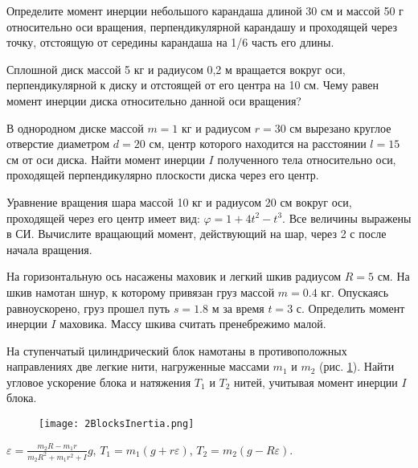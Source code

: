 \simpleProblems

\begin{ex}
Определите момент инерции небольшого карандаша длиной 30 см и массой 50 г относительно оси вращения, перпендикулярной карандашу и проходящей через точку, отстоящую от середины карандаша на 1/6 часть его длины.
\end{ex}	

\begin{ex}
Сплошной диск массой 5 кг и радиусом 0,2 м вращается вокруг оси, перпендикулярной к диску и отстоящей от его центра на 10 см. Чему равен момент инерции диска относительно данной оси вращения?
\end{ex}	

\begin{ex}
В однородном диске массой $m = 1$ кг и радиусом $r = 30$ см вырезано круглое отверстие диаметром $d = 20$ см, центр которого находится на расстоянии $l = 15$ см от оси диска. Найти момент инерции $I$ полученного тела относительно оси, проходящей перпендикулярно плоскости диска через его центр.
\end{ex}	

\begin{ex}
Уравнение вращения шара массой 10 кг и радиусом 20 см вокруг оси, проходящей через его центр имеет вид: $\varphi = 1 + 4t^2 - t^3$. Все величины выражены в СИ. Вычислите вращающий момент, действующий на шар, через 2 с после начала вращения.
\end{ex}	

\begin{ex}
На горизонтальную ось насажены маховик и легкий шкив радиусом $R = 5$ см. На шкив намотан шнур, к которому привязан груз массой $m = 0.4$ кг. Опускаясь равноускорено, груз прошел путь $s = 1.8$ м за время $t = 3$ с. Определить момент инерции $I$ маховика. Массу шкива считать пренебрежимо малой.
\end{ex}	

\complexProblems

\begin{ex} %
На ступенчатый цилиндрический блок намотаны в противоположных направлениях две легкие нити, нагруженные массами $m_1$ и $m_2$ (рис. \ref{2BlocksInertia}). Найти угловое ускорение блока и натяжения $T_1$ и $T_2$ нитей, учитывая момент инерции $I$ блока.

\begin{figure}[h]
\centering
\texttt{[image: 2BlocksInertia.png]}
\caption{}
\label{2BlocksInertia}
\end{figure}

\begin{ans}
$\varepsilon = \frac{m_2R - m_1r}{m_2R^2 + m_1r^2 + I}g$, $T_1 = m_1(g+r\varepsilon)$, $T_2 = m_2(g-R\varepsilon)$.
\end{ans}
\end{ex}	

